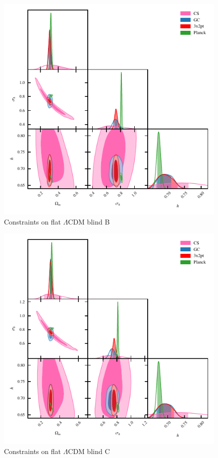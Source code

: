 
\begin{figure}
	\begin{center}
		\includegraphics[width=\columnwidth]{Parameter_Plots/cosmology/omegam_sigma8_h_blind_B}
		\caption{Constraints on flat $\Lambda$CDM blind B}
		\label{fig:cosmology-params}
	\end{center}
\end{figure}

\begin{figure}
	\begin{center}
		\includegraphics[width=\columnwidth]{Parameter_Plots/cosmology/omegam_sigma8_h_blind_C}
		\caption{Constraints on flat $\Lambda$CDM blind C}
		\label{fig:cosmology-params}
	\end{center}
\end{figure}


